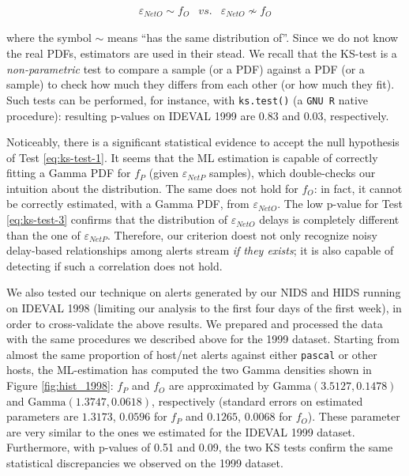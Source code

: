 \begin{equation}\label{eq:ks-test-3}
  \begin{array}{ccc}
    \varepsilon_{NetO} \sim f_{O} &vs.& \varepsilon_{NetO} \not\sim f_{O}
  \end{array}
\end{equation}

where the symbol $\sim$ means ``has the same distribution of''. Since we do not know the real \acp{PDF}, estimators are used in their stead. We recall that the \ac{KS}-test is a \emph{non-parametric} test to compare a sample (or a \ac{PDF}) against a \ac{PDF} (or a sample) to check how much they differs from each other (or how much they fit). Such tests can be performed, for instance, with \texttt{ks.test()} (a \texttt{GNU R} native procedure): resulting p-values on \ac{IDEVAL} 1999 are $0.83$ and $0.03$, respectively.

Noticeably, there is a significant statistical evidence to accept the null hypothesis of Test \ref{eq:ks-test-1}. It seems that the \ac{ML} estimation is capable of correctly fitting a Gamma \ac{PDF} for $f_{P}$ (given $\varepsilon_{NetP}$ samples), which double-checks our intuition about the distribution. The same does not hold for $f_{O}$: in fact, it cannot be correctly estimated, with a Gamma \ac{PDF}, from $\varepsilon_{NetO}$. The low p-value for Test \ref{eq:ks-test-3} confirms that the distribution of $\varepsilon_{NetO}$ delays is completely different than the one of $\varepsilon_{NetP}$. Therefore, our criterion doest not only recognize noisy delay-based relationships among alerts stream \emph{if they exists}; it is also capable of detecting if such a correlation does not hold.

We also tested our technique on alerts generated by our NIDS and HIDS
running on \ac{IDEVAL} 1998 (limiting our analysis to
the first four days of the first week), in order to cross-validate the
above results. We prepared and processed the data with the same
procedures we described above for the 1999 dataset. Starting from
almost the same proportion of host/net alerts against either
\texttt{pascal} or other hosts, the \ac{ML}-estimation has
computed the two Gamma densities shown in Figure \ref{fig:hist_1998}:
$f_{P}$ and $f_{O}$ are approximated by $\mathrm{Gamma}(3.5127,
0.1478)$ and $\mathrm{Gamma}(1.3747, 0.0618)$, respectively (standard
errors on estimated parameters are $1.3173$, $0.0596$ for $f_{P}$ and
$0.1265$, $0.0068$ for $f_{O}$). These parameter are very similar to
the ones we estimated for the \ac{IDEVAL} 1999
dataset. Furthermore, with p-values of 0.51 and 0.09, the two
\ac{KS} tests confirm the same statistical discrepancies we
observed on the 1999 dataset.

